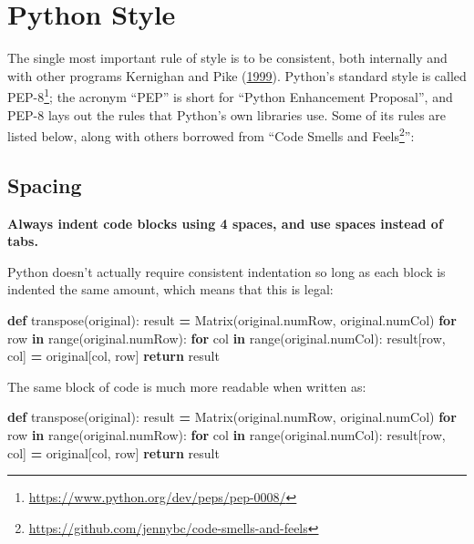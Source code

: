 \documentclass[
]{krantz}
\makeatletter
\newenvironment{Shaded}{\begin{snugshade}}{\end{snugshade}}
\newcommand{\BuiltInTok}[1]{#1}
\newcommand{\ControlFlowTok}[1]{\textcolor[rgb]{0.13,0.29,0.53}{\textbf{#1}}}
\newcommand{\KeywordTok}[1]{\textcolor[rgb]{0.13,0.29,0.53}{\textbf{#1}}}
\newcommand{\NormalTok}[1]{#1}
\newcommand{\OperatorTok}[1]{\textcolor[rgb]{0.81,0.36,0.00}{\textbf{#1}}}
\renewcommand{\href}[2]{#2\footnote{\url{#1}}}
\newenvironment{kframe}{%
\medskip{}
\setlength{\fboxsep}{.8em}
 \def\at@end@of@kframe{}%
 \ifinner\ifhmode%
  \def\at@end@of@kframe{\end{minipage}}%
  \begin{minipage}{\columnwidth}%
 \fi\fi%
 \def\FrameCommand##1{\hskip\@totalleftmargin \hskip-\fboxsep
 \colorbox{shadecolor}{##1}\hskip-\fboxsep
     \hskip-\linewidth \hskip-\@totalleftmargin \hskip\columnwidth}%
 \MakeFramed {\advance\hsize-\width
   \@totalleftmargin\z@ \linewidth\hsize
   \@setminipage}}%
 {\par\unskip\endMakeFramed%
 \at@end@of@kframe}
\renewenvironment{Shaded}{\begin{kframe}}{\end{kframe}}
\makeatother
\begin{document}
\hypertarget{style-pep8}{%
\section{Python Style}\label{style-pep8}}

The single most important rule of style is to be consistent,
both internally and with other programs Kernighan and Pike (\protect\hyperlink{ref-Kern1999}{1999}).
Python's standard style is called \href{https://www.python.org/dev/peps/pep-0008/}{PEP-8};
the acronym ``PEP'' is short for ``Python Enhancement Proposal'',
and PEP-8 lays out the rules that Python's own libraries use.
Some of its rules are listed below,
along with others borrowed from ``\href{https://github.com/jennybc/code-smells-and-feels}{Code Smells and Feels}'':

\hypertarget{spacing}{%
\subsection{Spacing}\label{spacing}}

\textbf{Always indent code blocks using 4 spaces, and use spaces instead of tabs.}

Python doesn't actually require consistent indentation
so long as each block is indented the same amount,
which means that this is legal:

\begin{Shaded}
\begin{Highlighting}[]
\KeywordTok{def}\NormalTok{ transpose(original):}
\NormalTok{  result }\OperatorTok{=}\NormalTok{ Matrix(original.numRow, original.numCol)}
  \ControlFlowTok{for}\NormalTok{ row }\KeywordTok{in} \BuiltInTok{range}\NormalTok{(original.numRow):}
              \ControlFlowTok{for}\NormalTok{ col }\KeywordTok{in} \BuiltInTok{range}\NormalTok{(original.numCol):}
\NormalTok{               result[row, col] }\OperatorTok{=}\NormalTok{ original[col, row]}
  \ControlFlowTok{return}\NormalTok{ result}
\end{Highlighting}
\end{Shaded}

The same block of code is much more readable when written as:

\begin{Shaded}
\begin{Highlighting}[]
\KeywordTok{def}\NormalTok{ transpose(original):}
\NormalTok{    result }\OperatorTok{=}\NormalTok{ Matrix(original.numRow, original.numCol)}
    \ControlFlowTok{for}\NormalTok{ row }\KeywordTok{in} \BuiltInTok{range}\NormalTok{(original.numRow):}
        \ControlFlowTok{for}\NormalTok{ col }\KeywordTok{in} \BuiltInTok{range}\NormalTok{(original.numCol):}
\NormalTok{            result[row, col] }\OperatorTok{=}\NormalTok{ original[col, row]}
    \ControlFlowTok{return}\NormalTok{ result}
\end{Highlighting}
\end{Shaded}
\end{document}
